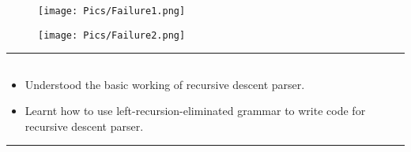 \documentclass[12pt,letterpaper]{article}
\begin{document}
\newpage
\subsubsection*{}
\begin{figure}[h!]
    \centering
    \texttt{[image: Pics/Failure1.png]}
\end{figure}
\newpage
\begin{figure}[h]
    \centering
    \texttt{[image: Pics/Failure2.png]}
\end{figure}
\hrule
\subsection*{}
\begin{flushleft}
    \renewcommand{\labelitemi}{$\textendash$}
    \begin{itemize}
        \item Understood the basic working of recursive descent parser. 
        \item Learnt how to use left-recursion-eliminated grammar to write code for recursive descent parser.
    \end{itemize}
\end{flushleft}
\hrule
\end{document}
